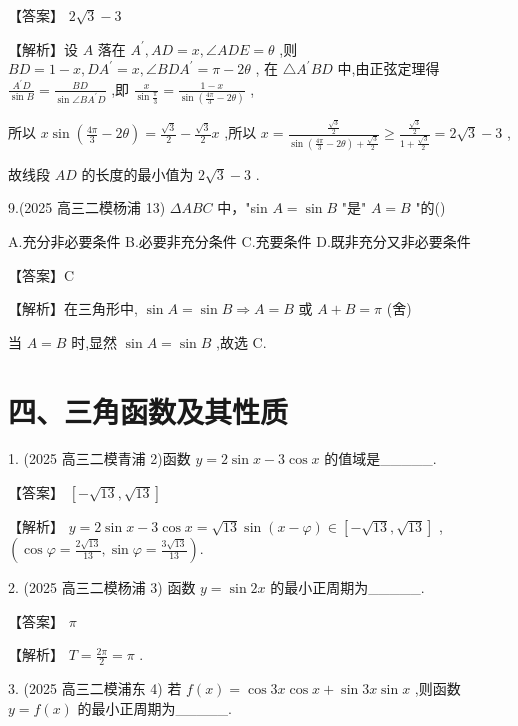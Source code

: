 \documentclass[10pt]{article}
\begin{document}
【答案】 \(2\sqrt{3} - 3\)

【解析】设 \(A\) 落在 \({A}^{\prime },{AD} = x,\angle {ADE} = \theta\) ,则 \({BD} = 1 - x,D{A}^{\prime } = x,\angle {BD}{A}^{\prime } = \pi  - {2\theta }\) , 在 \(\bigtriangleup {A}^{\prime }{BD}\) 中,由正弦定理得 \(\frac{{A}^{\prime }D}{\sin B} = \frac{BD}{\sin \angle B{A}^{\prime }D}\) ,即 \(\frac{x}{\sin \frac{\pi }{3}} = \frac{1 - x}{\sin \left( {\frac{4\pi }{3} - {2\theta }}\right) }\) ,

所以 \(x\sin \left( {\frac{4\pi }{3} - {2\theta }}\right)  = \frac{\sqrt{3}}{2} - \frac{\sqrt{3}}{2}x\) ,所以 \(x = \frac{\frac{\sqrt{3}}{2}}{\sin \left( {\frac{4\pi }{3} - {2\theta }}\right)  + \frac{\sqrt{3}}{2}} \geq  \frac{\frac{\sqrt{3}}{2}}{1 + \frac{\sqrt{3}}{2}} = 2\sqrt{3} - 3\) ,

故线段 \({AD}\) 的长度的最小值为 \(2\sqrt{3} - 3\) .

9.(2025 高三二模杨浦 13) \({\Delta ABC}\) 中，"sin \(A = \sin B\) "是" \(A = B\) "的()

A.充分非必要条件 B.必要非充分条件 C.充要条件 D.既非充分又非必要条件

【答案】C

【解析】在三角形中, \(\sin A = \sin B \Rightarrow  A = B\) 或 \(A + B = \pi\) (舍)

当 \(A = B\) 时,显然 \(\sin A = \sin B\) ,故选 C.

\section*{四、三角函数及其性质}

1. (2025 高三二模青浦 2)函数 \(y = 2\sin x - 3\cos x\) 的值域是\_\_\_\_\_.

【答案】 \(\left\lbrack  {-\sqrt{13},\sqrt{13}}\right\rbrack\)

【解析】 \(y = 2\sin x - 3\cos x = \sqrt{13}\sin \left( {x - \varphi }\right)  \in  \left\lbrack  {-\sqrt{13},\sqrt{13}}\right\rbrack\) , \(\left( {\cos \varphi  = \frac{2\sqrt{13}}{13},\sin \varphi  = \frac{3\sqrt{13}}{13}}\right) .\)

2. (2025 高三二模杨浦 3) 函数 \(y = \sin {2x}\) 的最小正周期为\_\_\_\_\_.

【答案】 \(\pi\)

【解析】 \(T = \frac{2\pi }{2} = \pi\) .

3. (2025 高三二模浦东 4) 若 \(f\left( x\right)  = \cos {3x}\cos x + \sin {3x}\sin x\) ,则函数 \(y = f\left( x\right)\) 的最小正周期为\_\_\_\_\_.
\end{document}
